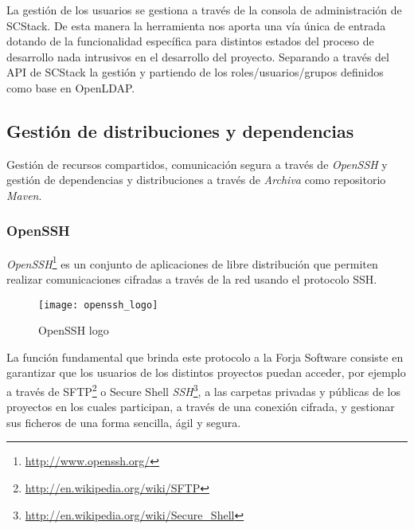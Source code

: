 \par La gestión de los usuarios se gestiona a través de la consola de administración de SCStack. De esta manera la herramienta nos aporta una vía única de entrada dotando de la funcionalidad específica para distintos estados del proceso de desarrollo nada intrusivos en el desarrollo del proyecto. Separando a través del API de SCStack la gestión y partiendo de los roles/usuarios/grupos definidos como base en OpenLDAP.



\subsection{Gestión de distribuciones y dependencias}
\label{sub:distribuciones-dependencias}

\par Gestión de recursos compartidos, comunicación segura a través de \emph{OpenSSH} y gestión de dependencias y distribuciones a través de \emph{Archiva} como repositorio \emph{Maven}.

\subsubsection{OpenSSH}
\label{ssub:openssh}

\par \emph{OpenSSH}\footnote{\url{http://www.openssh.org/}} es un conjunto de aplicaciones de libre distribución que permiten realizar comunicaciones cifradas a través de la red usando el protocolo SSH.

\begin{figure}[H]
    \centering
    \texttt{[image: openssh\_logo]}
    \caption{OpenSSH logo}
    \label{fig:openssh_logo}
\end{figure}

\par La función fundamental que brinda este protocolo a la Forja Software consiste en garantizar que los usuarios de los distintos proyectos puedan acceder, por ejemplo a través de SFTP\footnote{\url{http://en.wikipedia.org/wiki/SFTP}} o Secure Shell \emph{SSH}\footnote{\url{http://en.wikipedia.org/wiki/Secure\_Shell}}, a las carpetas privadas y públicas de los proyectos en los cuales participan, a través de una conexión cifrada, y gestionar sus ficheros de una forma sencilla, ágil y segura.

